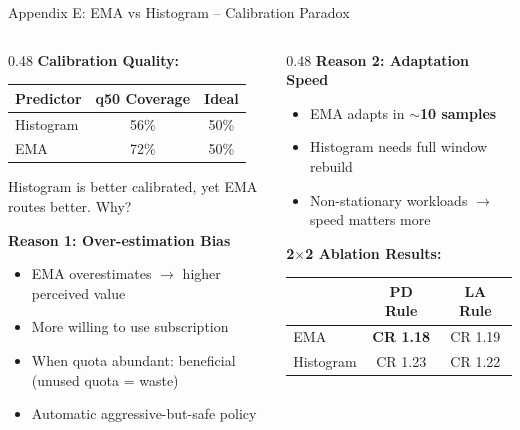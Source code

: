 \documentclass[aspectratio=169,10pt]{beamer}
\begin{document}
\begin{frame}[noframenumbering]
\hypertarget{app:q3}{}{Appendix E: EMA vs Histogram -- Calibration Paradox}
\begin{columns}[T]
\begin{column}{0.48\textwidth}
\textbf{Calibration Quality:}

\vspace{0.1cm}
\footnotesize
\begin{tabular}{lcc}
\toprule
Predictor & q50 Coverage & Ideal \\
\midrule
Histogram & 56\% & 50\% \\
EMA & 72\% & 50\% \\
\bottomrule
\end{tabular}

\vspace{0.15cm}
\normalsize
Histogram is better calibrated, yet EMA routes better. Why?

\vspace{0.2cm}
\textbf{Reason 1: Over-estimation Bias}
\begin{itemize}\setlength{\itemsep}{2pt}
    \item EMA overestimates $\to$ higher perceived value
    \item More willing to use subscription
    \item When quota abundant: beneficial (unused quota = waste)
    \item Automatic aggressive-but-safe policy
\end{itemize}
\end{column}

\begin{column}{0.48\textwidth}
\textbf{Reason 2: Adaptation Speed}
\begin{itemize}\setlength{\itemsep}{2pt}
    \item EMA adapts in $\sim$\textbf{10 samples}
    \item Histogram needs full window rebuild
    \item Non-stationary workloads $\to$ speed matters more
\end{itemize}

\vspace{0.2cm}
\textbf{2$\times$2 Ablation Results:}

\vspace{0.1cm}
\footnotesize
\begin{tabular}{lcc}
\toprule
 & PD Rule & LA Rule \\
\midrule
EMA & \textbf{CR 1.18} & CR 1.19 \\
Histogram & CR 1.23 & CR 1.22 \\
\bottomrule
\end{tabular}


\end{column}
\end{columns}
\end{frame}
\end{document}

